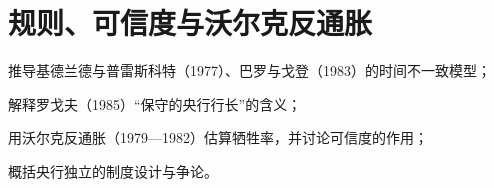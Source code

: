 \chapter{规则、可信度与沃尔克反通胀}\label{ch:credibility}

\begin{chapterguide}
\begin{guidegoals}
\item 推导基德兰德与普雷斯科特（1977）、巴罗与戈登（1983）的时间不一致模型；
\item 解释罗戈夫（1985）“保守的央行行长”的含义；
\item 用沃尔克反通胀（1979—1982）估算牺牲率，并讨论可信度的作用；
\item 概括央行独立的制度设计与争论。
\end{guidegoals}
\end{chapterguide}

\chapterstub
